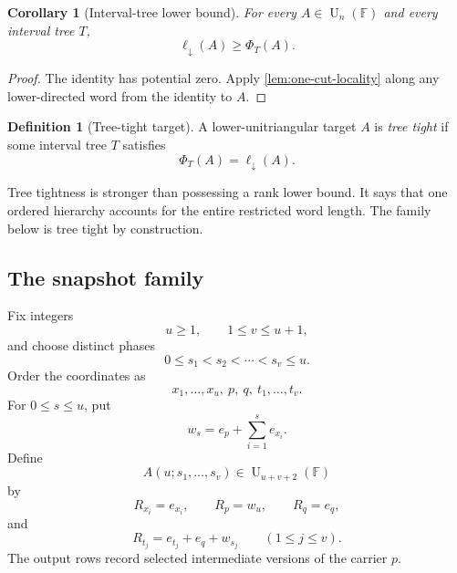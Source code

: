 \documentclass[11pt]{amsart}
\numberwithin{equation}{section}
\newtheorem{corollary}[theorem]{Corollary}
\theoremstyle{definition}
\newtheorem{definition}[theorem]{Definition}
\theoremstyle{remark}
\newcommand{\F}{\mathbb F}
\newcommand{\U}{\operatorname{U}}
\newcommand{\ellDown}{\ell_{\downarrow}}
\begin{document}
\begin{corollary}[Interval-tree lower bound]\label{cor:tree-lower-bound}
For every $A\in\U_n(\F)$ and every interval tree $T$,
\[
\ellDown(A)\ge\Phi_T(A).
\]
\end{corollary}

\begin{proof}
The identity has potential zero.  Apply \cref{lem:one-cut-locality} along any lower-directed word from the identity to $A$.
\end{proof}

\begin{definition}[Tree-tight target]\label{def:tree-tight}
A lower-unitriangular target $A$ is \emph{tree tight} if some interval tree $T$ satisfies
\[
\Phi_T(A)=\ellDown(A).
\]
\end{definition}

Tree tightness is stronger than possessing a rank lower bound.  It says that one ordered hierarchy accounts for the entire restricted word length.  The family below is tree tight by construction.

\subsection{The snapshot family}

Fix integers
\[
u\ge1,
\qquad
1\le v\le u+1,
\]
and choose distinct phases
\[
0\le s_1<s_2<\cdots<s_v\le u.
\]
Order the coordinates as
\[
x_1,\ldots,x_u,\ p,\ q,\ t_1,\ldots,t_v.
\]
For $0\le s\le u$, put
\begin{equation}\label{eq:prefix-state}
w_s=e_p+\sum_{i=1}^{s}e_{x_i}.
\end{equation}
Define
\begin{equation}\label{eq:snapshot-target}
A(u;s_1,\ldots,s_v)\in\U_{u+v+2}(\F)
\end{equation}
by
\[
R_{x_i}=e_{x_i},
\qquad
R_p=w_u,
\qquad
R_q=e_q,
\]
and
\begin{equation}\label{eq:snapshot-output}
R_{t_j}=e_{t_j}+e_q+w_{s_j}
\qquad(1\le j\le v).
\end{equation}
The output rows record selected intermediate versions of the carrier $p$.
\end{document}
